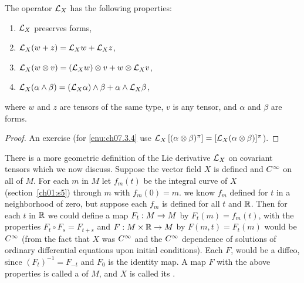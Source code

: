 \documentclass[../main]{subfiles}
\begin{document}
\begin{proposition} \label{prop:ch7.3.1}
The operator $\mathcal{L}_{X}$ has the following properties:

\begin{enumerate}[label = (\arabic*)]
    \item \label{enu:ch07.3.1} $\mathcal{L}_{X}$ preserves forms,
    \item\label{enu:ch07.3.2} $\mathcal{L}_{X}(w+z)=\mathcal{L}_{X} w+\mathcal{L}_{X} z$,
    \item \label{enu:ch07.3.3}$\mathcal{L}_{X}(w \otimes v)=\left(\mathcal{L}_{X} w\right) \otimes v+w \otimes \mathcal{L}_{X} v$,
    \item \label{enu:ch07.3.4}$\mathcal{L}_{X}(\alpha \wedge \beta)=\left(\mathcal{L}_{X} \alpha\right) \wedge \beta+\alpha \wedge \mathcal{L}_{X} \beta$,
\end{enumerate}

where $w$ and $z$ are tensors of the same type, $v$ is any tensor, and $\alpha$ and $\beta$ are forms.
\end{proposition}

\begin{proof}
An exercise (for \ref{enu:ch07.3.4} use $\mathcal{L}_{X}\left[(\alpha \otimes \beta)^\pi\right] = [\mathcal{L}_{X}(\alpha \otimes \beta)]^\pi$).
\end{proof}



There is a more geometric definition of the Lie derivative $\mathcal{L}_{X}$ on covariant tensors which we now discuss. Suppose the vector field $X$ is defined and $C^\infty$ on all of $M$. For each $m$ in $M$ let $f_{m}(t)$ be the integral curve of $X$ (section~\ref{ch01:s5}) through $m$ with $f_{m}(0)=m$. we know $f_{m}$ defined for $t$ in a neighborhood of zero, but suppose each $f_{m}$ is defined for all $t$ and $\mathbb{R}$. Then for each $t$ in $\mathbb{R}$ we could define a map $F_{t}: M \to M$ by $F_{t}(m)=f_{m}(t)$, with the properties $F_{t} \circ F_{s}=F_{t+s}$ and $F: M \times \mathbb{R} \to M$ by $F(m, t)=F_{t}(m)$ would be $C^\infty$ (from the fact that $X$ was $C^\infty$ and the $C^\infty$ dependence of solutions of ordinary differential equations upon initial conditions). Each $F$, would be a diffeo, since $\left(F_{t}\right)^{-1}=F_{-t}$ and $F_{0}$ is the identity map. A map $F$ with the above properties is called a  of $M$, and $X$ is called its .
\end{document}
